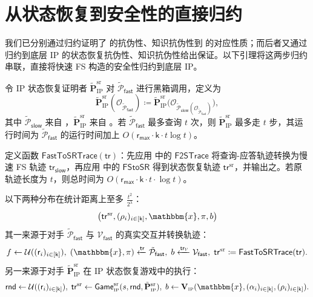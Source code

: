 \documentclass[american,singlepageview]{snargs-book-zh}
\newcommand{\Malicious}[1]{\tilde{#1}}
\newcommand{\DefineEqual}{\coloneqq}
\newcommand{\BlackBox}[1]{\mathcal{O}_{#1}}
\newcommand{\DecisionBit}{b}
\newcommand{\Instance}{\mathbbm{x}}
\newcommand{\ProtoProver}{P}
\newcommand{\ProtoVerifier}{V}
\newcommand{\ProtoRoundComplexity}{\mathsf{k}}
\newcommand{\ProtoRandomnessComplexity}{\mathsf{r}}
\newcommand{\RoundIndex}{i}
\newcommand{\SRSuperscript}{\mathrm{sr}}
\newcommand{\IPSubscript}{\scriptscriptstyle\mathrm{IP}}
\newcommand{\IPFormat}[1]{\mathbf{#1}}
\newcommand{\IPVerifier}{\IPFormat{\ProtoVerifier}_{\IPSubscript}}
\newcommand{\IPMaliciousProver}{\Malicious{\IPFormat{\ProtoProver}}_{\IPSubscript}}
\newcommand{\IPRoundComplexity}{\ProtoRoundComplexity}
\newcommand{\IPRandomnessComplexity}{\ProtoRandomnessComplexity}
\newcommand{\IPMaxRandomnessComplexity}{\IPRandomnessComplexity_{{\scriptscriptstyle\mathsf{max}}}}
\newcommand{\IPProverMessage}{\alpha}
\newcommand{\IPVerifierRandomMessage}{\rho}
\newcommand{\IPTuple}[1]{(#1_{\RoundIndex})_{\RoundIndex \in [\IPRoundComplexity]}}
\newcommand{\IPVerifierInput}{\Instance,\IPTuple{\IPProverMessage},\IPTuple{\IPVerifierRandomMessage}}
\newcommand{\ARGFormat}[1]{\mathcal{#1}}
\newcommand{\ARGProver}{\ARGFormat{\ProtoProver}}
\newcommand{\ARGVerifier}{\ARGFormat{\ProtoVerifier}}
\newcommand{\ARGString}{\pi}
\newcommand{\ROFunction}{f}
\newcommand{\ROQueryBound}{t}
\newcommand{\RODistribution}[1]{\mathcal{U}(#1)}
\newcommand{\SecurityParameter}{\lambda}
\newcommand{\ROTrace}{\mathsf{tr}}
\newcommand{\ROTraceVerifier}{\ROTrace_{\scalebox{0.5}{$\ARGVerifier$}}}
\newcommand{\SlowFSSymbol}{\mathsf{slow}}
\newcommand{\FastFSSymbol}{\mathsf{fast}}
\newcommand{\SlowFSMaliciousProver}{\Malicious{\ARGProver}_{\SlowFSSymbol}}
\newcommand{\FastFSMaliciousProver}{\Malicious{\ARGProver}_{\FastFSSymbol}}
\newcommand{\FastTraceToSlowTrace}{\mathsf{F2STrace}}
\newcommand{\FastToSRTrace}{\mathsf{FastToSRTrace}}
\newcommand{\FastTraceToSlowTraceTime}{O(\IPMaxRandomnessComplexity \cdot \IPRoundComplexity \cdot \ROQueryBound \cdot \log \ROQueryBound)}
\newcommand{\FSToSR}{\mathsf{FStoSR}}
\newcommand{\SRSaltSize}{s}
\newcommand{\SRRandomness}{\mathsf{rnd}}
\newcommand{\SRTrace}{\ROTrace^{\SRSuperscript}}
\newcommand{\SRGameName}[1]{\mathsf{Game}_{#1}^{\SRSuperscript}}
\newcommand{\IPStateRestorationGame}[3]{\SRGameName{\IPSubscript}(#1,#2,#3)}
\newcommand{\IPMaliciousSRProver}{\IPMaliciousProver^{\SRSuperscript}}
\newcommand{\FSErrorExpression}[1][\ROQueryBound]{\frac{#1^2}{2^{\SecurityParameter}}}
\begin{document}
\section{从状态恢复到安全性的直接归约}
\label{section:fs-direct-reduction-to-sr}

我们已分别通过归约证明了  的抗伪性、知识抗伪性到  的对应性质；而后者又通过归约到底层 IP 的状态恢复抗伪性、知识抗伪性给出保证。以下引理将这两步归约串联，直接将快速 FS 构造的安全性归约到底层 IP。

\begin{construction}
\label{construction:direct-fs-malicious-prover}
令 IP 状态恢复证明者 $\IPMaliciousSRProver$ 对 $\FastFSMaliciousProver$ 进行黑箱调用，定义为
\[
\IPMaliciousSRProver(\BlackBox{\FastFSMaliciousProver})
\DefineEqual
\IPMaliciousSRProver\bigl(\BlackBox{\SlowFSMaliciousProver(\BlackBox{\FastFSMaliciousProver})}\bigr),
\]
其中 $\SlowFSMaliciousProver$ 来自 ，$\IPMaliciousSRProver$ 来自 。若 $\FastFSMaliciousProver$ 最多查询 $\ROQueryBound$ 次，则 $\IPMaliciousSRProver$ 最多走 $\ROQueryBound$ 步，其运行时间为 $\FastFSMaliciousProver$ 的运行时间加上 $O(\IPMaxRandomnessComplexity\cdot\IPRoundComplexity\cdot\ROQueryBound\log\ROQueryBound)$。
\end{construction}

\begin{construction}
\label{construction:fast-trace-to-sr-trace}
定义函数 $\FastToSRTrace(\ROTrace)$：先应用  中的 $\FastTraceToSlowTrace$ 将查询-应答轨迹转换为慢速 FS 轨迹 $\ROTrace_{\SlowFSSymbol}$，再应用  中的 $\FSToSR$ 得到状态恢复轨迹 $\SRTrace$，并输出之。若原轨迹长度为 $\ROQueryBound$，则总时间为 $\FastTraceToSlowTraceTime$。
\end{construction}

\begin{lemma}
\label{lemma:fast-fs-to-state-restoration}
以下两种分布在统计距离上至多 $\FSErrorExpression$：
\[
\bigl(\SRTrace,\IPTuple{\IPVerifierRandomMessage},\Instance,\ARGString,\DecisionBit\bigr)
\]
其一来源于对手 $\FastFSMaliciousProver$ 与 $\ARGVerifier_{\FastFSSymbol}$ 的真实交互并转换轨迹：
\[
\ROFunction\gets\RODistribution{\IPTuple{\IPRandomnessComplexity}},\;
(\Instance,\ARGString)\xleftarrow{\ROTrace}\FastFSMaliciousProver,\;
\DecisionBit\xleftarrow{\ROTraceVerifier}\ARGVerifier_{\FastFSSymbol},\;
\SRTrace\DefineEqual\FastToSRTrace(\ROTrace).
\]
另一来源于对手 $\IPMaliciousSRProver$ 在 IP 状态恢复游戏中的执行：
\[
\SRRandomness\gets\RODistribution{\IPTuple{\IPRandomnessComplexity}},\;
\SRTrace\gets\IPStateRestorationGame{\SRSaltSize}{\SRRandomness}{\IPMaliciousSRProver},\;
\DecisionBit\gets\IPVerifier(\IPVerifierInput).
\]
\end{lemma}
\end{document}
